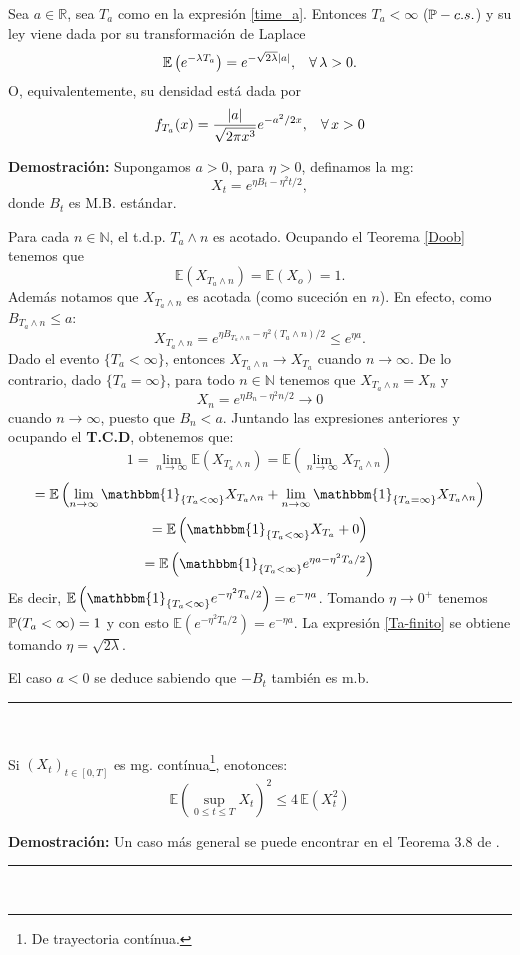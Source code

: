 \begin{prop}
Sea $a \in \mathbb{R}$, sea $T_a$ como en la expresión \ref{time_a}. Entonces $T_a < \infty$ ($\mathbb{P} - c.s.$) y su ley viene dada por su transformación de Laplace
\begin{equation}
    \mathbb{E}\left(e^{-\lambda T_a}\right) = e^{-\sqrt{2\lambda}|a|},\hspace{0.3cm}\forall\,\lambda>0.
    \label{Ta-finito}
\end{equation}
O, equivalentemente, su densidad está dada por
\[f_{T_a}(x) = \frac{|a|}{\sqrt{2\pi x^3}}e^{-a^2/2x},\hspace{0.3cm}\forall\,x>0\]
\label{prop-21}
\end{prop}
\textbf{Demostración:} Supongamos $a>0$, para $\eta >0$, definamos la mg:
\[X_t = e^{\eta B_t - \eta^2 t/2},\]
donde $B_t$ es M.B. estándar.

Para cada $n\in \mathbb{N}$, el t.d.p. $T_a\wedge n$ es acotado. Ocupando el Teorema \ref{Doob} tenemos que
\[\mathbb{E}\left(X_{T_a\wedge n}\right) = \mathbb{E}\left(X_o\right) = 1.\]
Además notamos que $X_{T_a\wedge n}$ es acotada (como suceción en $n$). En efecto, como $B_{T_a\wedge n} \leq a$:
\[X_{T_a\wedge n} = e^{\eta B_{T_a\wedge n} - \eta^2 (T_a\wedge n)/2} \leq e^{\eta a}.\]
Dado el evento $\{T_a < \infty\}$, entonces $X_{T_a\wedge n} \rightarrow X_{T_a}$ cuando $n\rightarrow \infty$. De lo contrario, dado $\{T_a = \infty\}$, para todo $n\in \mathbb{N}$ tenemos que $X_{T_a\wedge n} = X_n$ y
\[X_n = e^{\eta B_n - \eta^2 n/2} \rightarrow 0\]
cuando $n\rightarrow \infty$, puesto que $B_n < a$. Juntando las expresiones anteriores y ocupando el \textbf{T.C.D}, obtenemos que:
\[1 = \lim_{n\rightarrow \infty} \mathbb{E}\left(X_{T_a\wedge n}\right) = \mathbb{E}\left( \lim_{n\rightarrow \infty} X_{T_a\wedge n}\right)\]
\[ = \mathbb{E}\left(\lim_{n\rightarrow \infty} \mathbbm{1}_{\{T_a < \infty\}}X_{T_a\wedge n} + \lim_{n\rightarrow \infty}\mathbbm{1}_{\{T_a = \infty\}}X_{T_a\wedge n}\right)\]
\[ = \mathbb{E}\left(\mathbbm{1}_{\{T_a < \infty\}}X_{T_a} + 0 \right)\]
\[ = \mathbb{E}\left(\mathbbm{1}_{\{T_a < \infty\}}e^{\eta a - \eta^2 T_a / 2}\right)\]
Es decir, $\mathbb{E}\left(\mathbbm{1}_{\{T_a < \infty\}}e^{ - \eta^2 T_a / 2}\right) = e^{-\eta a}$. Tomando $\eta \rightarrow 0^{+}$ tenemos $\mathbb{P}(T_a < \infty) = 1$ y con esto $\mathbb{E}\left(e^{ - \eta^2 T_a / 2}\right) = e^{-\eta a}$. La expresión \ref{Ta-finito} se obtiene tomando $\eta = \sqrt{2\lambda}$.

El caso $a<0$ se deduce sabiendo que $-B_t$ también es m.b.\\\rule{0.7em}{0.7em}\\

\begin{teorema}
Si $(X_t)_{t\in [0,T]}$ es mg. contínua\footnote{De trayectoria contínua.}, enotonces:
\[\mathbb{E}\left(\sup_{0\leq t \leq T} X_t\right)^2 \leq 4\,\mathbb{E}(X_t^2)\]
\label{Doob-desigualdad}
\end{teorema}
\textbf{Demostración:} Un caso más general se puede encontrar en el Teorema 3.8 de \cite{Kara}.
\rule{0.7em}{0.7em}\\

